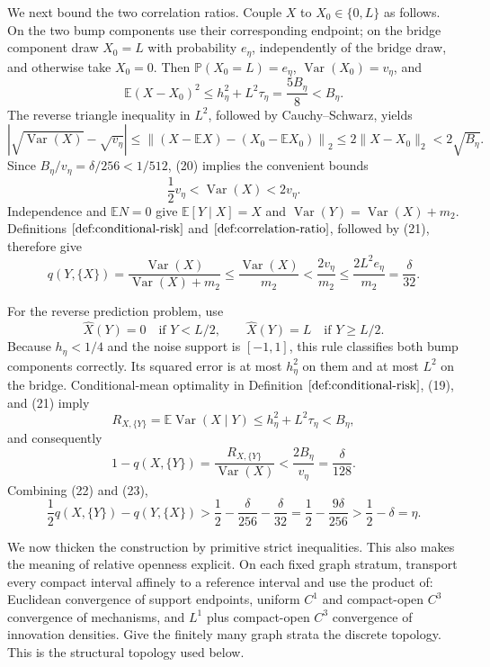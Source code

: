 We next bound the two correlation ratios.  Couple \(X\) to \(X_0\in\{0,L\}\) as follows.  On the two bump components use their corresponding endpoint; on the bridge component draw \(X_0=L\) with probability \(e_\eta\), independently of the bridge draw, and otherwise take \(X_0=0\).  Then \(\mathbb P(X_0=L)=e_\eta\), \(\operatorname{Var}(X_0)=v_\eta\), and
\[
 \mathbb E(X-X_0)^2
 \le h_\eta^2+L^2\tau_\eta
 =\frac{5B_\eta}{8}<B_\eta. \tag{19}
\]
The reverse triangle inequality in \(L^2\), followed by Cauchy--Schwarz, yields
\[
 \left|\sqrt{\operatorname{Var}(X)}-\sqrt{v_\eta}\right|
 \le \left\|(X-\mathbb EX)-(X_0-\mathbb EX_0)\right\|_2
 \le2\|X-X_0\|_2<2\sqrt{B_\eta}. \tag{20}
\]
Since \(B_\eta/v_\eta=\delta/256<1/512\), (20) implies the convenient bounds
\[
 \frac12v_\eta<\operatorname{Var}(X)<2v_\eta. \tag{21}
\]
Independence and \(\mathbb EN=0\) give \(\mathbb E[Y\mid X]=X\) and \(\operatorname{Var}(Y)=\operatorname{Var}(X)+m_2\).  Definitions \(\ref{def:conditional-risk}\) and \(\ref{def:correlation-ratio}\), followed by (21), therefore give
\[
 q(Y,\{X\})
 =\frac{\operatorname{Var}(X)}{\operatorname{Var}(X)+m_2}
 \le\frac{\operatorname{Var}(X)}{m_2}
 <\frac{2v_\eta}{m_2}
 \le\frac{2L^2e_\eta}{m_2}
 =\frac{\delta}{32}. \tag{22}
\]

For the reverse prediction problem, use
\[
 \widehat X(Y)=0\quad\text{if }Y<L/2,
 \qquad
 \widehat X(Y)=L\quad\text{if }Y\ge L/2.
\]
Because \(h_\eta<1/4\) and the noise support is \([-1,1]\), this rule classifies both bump components correctly.  Its squared error is at most \(h_\eta^2\) on them and at most \(L^2\) on the bridge.  Conditional-mean optimality in Definition \(\ref{def:conditional-risk}\), (19), and (21) imply
\[
 R_{X,\{Y\}}=\mathbb E\operatorname{Var}(X\mid Y)
 \le h_\eta^2+L^2\tau_\eta<B_\eta,
\]
and consequently
\[
 1-q(X,\{Y\})
 =\frac{R_{X,\{Y\}}}{\operatorname{Var}(X)}
 <\frac{2B_\eta}{v_\eta}
 =\frac{\delta}{128}. \tag{23}
\]
Combining (22) and (23),
\[
 \frac12q(X,\{Y\})-q(Y,\{X\})
 >\frac12-\frac{\delta}{256}-\frac{\delta}{32}
 =\frac12-\frac{9\delta}{256}
 >\frac12-\delta=\eta. \tag{24}
\]

We now thicken the construction by primitive strict inequalities.  This also makes the meaning of relative openness explicit.  On each fixed graph stratum, transport every compact interval affinely to a reference interval and use the product of: Euclidean convergence of support endpoints, uniform \(C^1\) and compact-open \(C^3\) convergence of mechanisms, and \(L^1\) plus compact-open \(C^3\) convergence of innovation densities.  Give the finitely many graph strata the discrete topology.  This is the structural topology used below.

